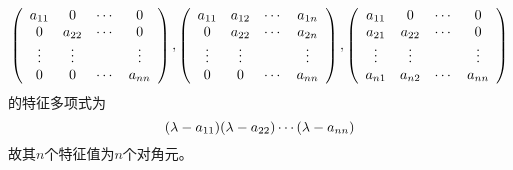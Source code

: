 \begin{frame}
  
    \begin{li}
      $$
      \left(
      \begin{array}{cccc}
        a_{11}&0&\cdots&0\\
        0&a_{22}&\cdots&0\\
        \vdots&\vdots&&\vdots\\
        0&0&\cdots&a_{nn}
      \end{array}
      \right), \left(
      \begin{array}{cccc}
        a_{11}&a_{12}&\cdots&a_{1n}\\
        0&a_{22}&\cdots&a_{2n}\\
        \vdots&\vdots&&\vdots\\
        0&0&\cdots&a_{nn}
      \end{array}
      \right),\left(
      \begin{array}{cccc}
        a_{11}&0&\cdots&0\\
        a_{21}&a_{22}&\cdots&0\\
        \vdots&\vdots&&\vdots\\
        a_{n1}&a_{n2}&\cdots&a_{nn}
      \end{array}
      \right)
      $$
      的特征多项式为
      $$
      (\lambda-a_{11})(\lambda-a_{22})\cdots(\lambda-a_{nn})
      $$
      故其$n$个特征值为$n$个对角元。
    \end{li}
  
\end{frame}

